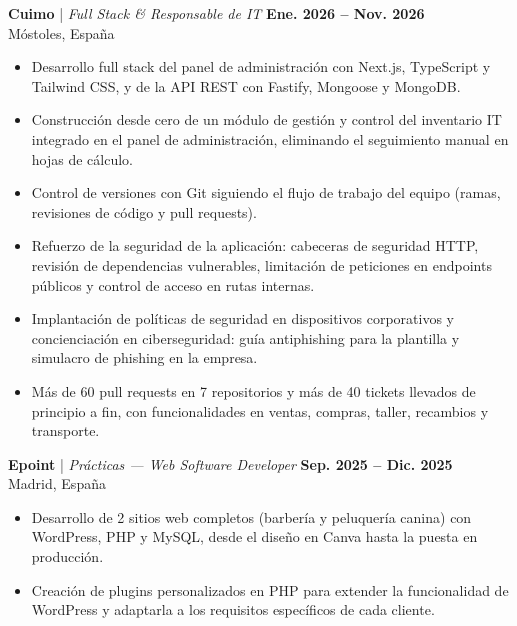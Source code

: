 \documentclass[10pt,a4paper]{article}
\begin{document}
\textbf{Cuimo} | \textit{Full Stack \& Responsable de IT} \hfill \textbf{Ene. 2026 -- Nov. 2026} \\
Móstoles, España
\begin{itemize}
    \item Desarrollo full stack del panel de administración con Next.js, TypeScript y Tailwind CSS, y de la API REST con Fastify, Mongoose y MongoDB.
    \item Construcción desde cero de un módulo de gestión y control del inventario IT integrado en el panel de administración, eliminando el seguimiento manual en hojas de cálculo.
    \item Control de versiones con Git siguiendo el flujo de trabajo del equipo (ramas, revisiones de código y pull requests).
    \item Refuerzo de la seguridad de la aplicación: cabeceras de seguridad HTTP, revisión de dependencias vulnerables, limitación de peticiones en endpoints públicos y control de acceso en rutas internas.
    \item Implantación de políticas de seguridad en dispositivos corporativos y concienciación en ciberseguridad: guía antiphishing para la plantilla y simulacro de phishing en la empresa.
    \item Más de 60 pull requests en 7 repositorios y más de 40 tickets llevados de principio a fin, con funcionalidades en ventas, compras, taller, recambios y transporte.
\end{itemize}

\vspace{6pt}

\textbf{Epoint} | \textit{Prácticas --- Web Software Developer} \hfill \textbf{Sep. 2025 -- Dic. 2025} \\
Madrid, España
\begin{itemize}
    \item Desarrollo de 2 sitios web completos (barbería y peluquería canina) con WordPress, PHP y MySQL, desde el diseño en Canva hasta la puesta en producción.
    \item Creación de plugins personalizados en PHP para extender la funcionalidad de WordPress y adaptarla a los requisitos específicos de cada cliente.
\end{itemize}

\vspace{6pt}
\end{document}
